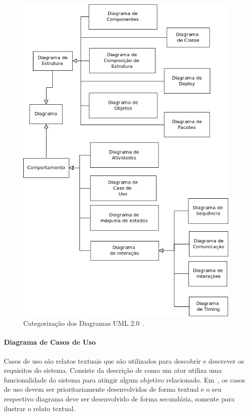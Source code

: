\begin{figure}
	\centering
	\includegraphics[scale=0.75]{images/categorias-diagramas.png}
	\caption{Categorização dos Diagramas UML 2.0~\cite{fowler04}.}
	\label{fig:categorias-diagramas}
\end{figure}

\paragraph{Diagrama de Casos de Uso}

Casos de uso são relatos textuais que são utilizados para descobrir e descrever os requisitos do sistema. Consiste da descrição de como um ator utiliza uma funcionalidade do sistema para atingir algum objetivo relacionado. Em~\cite{larman08}, os casos de uso devem ser prioritariamente desenvolvidos de forma textual e o seu respectivo diagrama deve ser desenvolvido de forma secundária, somente para ilustrar o relato textual.


